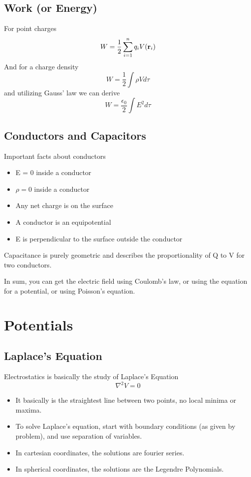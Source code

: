 \documentclass{article}
\begin{document}
\subsection{Work (or Energy)}

For point charges
$$
W = \frac{1}{2} \sum_{i=1}^n q_iV(\vb{r}_i)
$$
And for a charge density
$$
W = \frac{1}{2} \int \rho V d\tau
$$
and utilizing Gauss' law we can derive
$$
W = \frac{\epsilon_0}{2} \int E^2 d\tau
$$

\subsection{Conductors and Capacitors}
Important facts about conductors
\begin{itemize}
    \item E = 0 inside a conductor
    \item $\rho = 0$ inside a conductor
    \item Any net charge is on the surface
    \item A conductor is an equipotential
    \item E is perpendicular to the surface outside the conductor
\end{itemize}

Capacitance is purely geometric and describes the proportionality of Q to V for two conductors.

In sum, you can get the electric field using Coulomb's law, or using the equation for a potential, or using Poisson's equation.

\section{Potentials}

\subsection{Laplace's Equation}
Electrostatics is basically the study of Laplace's Equation
$$
\nabla^2 V = 0
$$

\begin{itemize}
    \item It basically is the straightest line between two points, no local minima or maxima.
    \item To solve Laplace's equation, start with boundary conditions (as given by  problem), and use separation of variables.
    \item In cartesian coordinates, the solutions are fourier series.
    \item In spherical coordinates, the solutions are the Legendre Polynomials.
\end{itemize}
\end{document}
